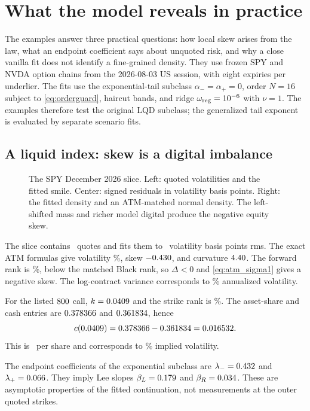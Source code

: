 \section{What the model reveals in practice}
\label{sec:examples}

The examples answer three practical questions: how local skew arises from the
law, what an endpoint coefficient says about unquoted risk, and why a close
vanilla fit does not identify a fine-grained density.  They use frozen SPY and
NVDA option chains from the 2026-08-03 US session, with eight expiries per
underlier.  The fits use the exponential-tail subclass
$\alpha_-=\alpha_+=0$, order $N=16$ subject to
\eqref{eq:orderguard}, haircut bands, and ridge
$\omega_{\rm reg}=10^{-6}$ with $\nu=1$.  The examples therefore test the
original LQD subclass; the generalized tail exponent is evaluated by separate
scenario fits.

\subsection{A liquid index: skew is a digital imbalance}

\begin{figure}[htbp]
\centering
{}
\caption{The SPY December 2026 slice.  Left: quoted volatilities and the
fitted smile.  Center: signed residuals in volatility basis points.  Right:
the fitted density and an ATM-matched normal density.  The left-shifted mass
and richer model digital produce the negative equity skew.}
\label{fig:spy_node}
\end{figure}

The slice contains \MacSpyDecNQuotes\ quotes and fits them to
\MacSpyDecRmsBp\ volatility basis points rms.  The exact ATM formulas give
volatility \MacSpyDecAtmVolPct\%, skew $-0.430$, and curvature
$4.40$.  The forward rank is \MacSpyDecForwardRankPct\%, below the
matched Black rank, so $\Delta<0$ and \eqref{eq:atm_sigma1} gives a negative
skew.  The log-contract variance corresponds to
\MacSpyDecVarSwapPct\% annualized volatility.

For the listed $800$ call, $k=0.0409$ and the strike rank is
\MacTicketRankPct\%.  The asset-share and cash entries are
$0.378366$ and $0.361834$, hence
\[
c(0.0409)=0.378366-0.361834=0.016532.
\]
This is \MacTicketDollarPrice\ per share and corresponds to
\MacTicketIvPct\% implied volatility.

The endpoint coefficients of the exponential subclass are
$\lambda_-=0.432$ and $\lambda_+=0.066$.  They imply Lee slopes
$\beta_L=0.179$ and $\beta_R=0.034$.  These are asymptotic
properties of the fitted continuation, not measurements at the outer quoted
strikes.

